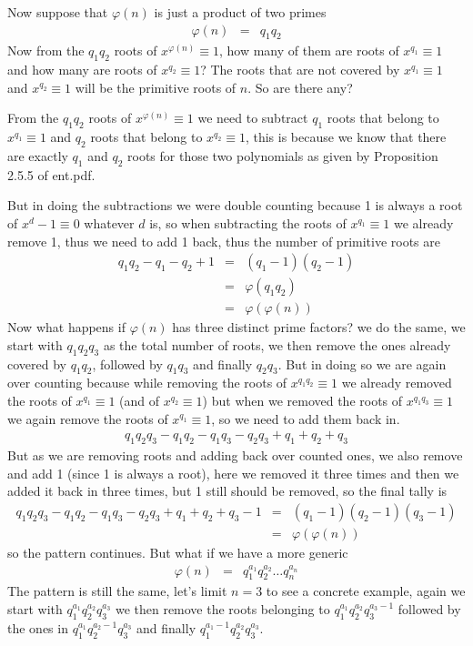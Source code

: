 \documentclass[aps,preprint,preprintnumbers,nofootinbib,showpacs,prd]{revtex4-1}
\newcommand{\nbea}{\begin{eqnarray*}}
\newcommand{\neea}{\end{eqnarray*}}
\begin{document}
Now suppose that $\varphi(n)$ is just a product of two primes
%
\nbea
\varphi(n) & = & q_1q_2
\neea
%
Now from the $q_1q_2$ roots of $x^{\varphi(n)} \equiv 1$, how many of them are roots of $x^{q_1} \equiv 1$ and how many are roots of $x^{q_2} \equiv 1$? The roots that are not covered by $x^{q_{1}} \equiv 1$ and $x^{q_{2}} \equiv 1$ will be the primitive roots of $n$. So are there any?

From the $q_1q_2$ roots of $x^{\varphi(n)} \equiv 1$ we need to subtract $q_1$ roots that belong to $x^{q_1} \equiv 1$ and $q_2$ roots that belong to $x^{q_2} \equiv 1$, this is because we know that there are exactly $q_1$ and $q_2$ roots for those two polynomials as given by Proposition 2.5.5 of ent.pdf.

But in doing the subtractions we were double counting because 1 is always a root of $x^d - 1 \equiv 0$ whatever $d$ is, so when subtracting the roots of $x^{q_1} \equiv 1$ we already remove 1, thus we need to add 1 back, thus the number of primitive roots are
%
\nbea
q_1q_2 - q_1 - q_2 + 1 & = & (q_1 - 1)(q_2 - 1) \\
& = & \varphi(q_1q_2) \\
& = & \varphi(\varphi(n))
\neea
%
Now what happens if $\varphi(n)$ has three distinct prime factors? we do the same, we start with $q_1q_2q_3$ as the total number of roots, we then remove the ones already covered by $q_1q_2$, followed by $q_1q_3$ and finally $q_2q_3$. But in doing so we are again over counting because while removing the roots of $x^{q_1q_2} \equiv 1$ we already removed the roots of $x^{q_1} \equiv 1$ (and of $x^{q_2} \equiv 1$) but when we removed the roots of $x^{q_1q_3} \equiv 1$ we again remove the roots of $x^{q_1} \equiv 1$, so we need to add them back in.
%
\nbea
q_1q_2q_3 - q_1q_2 - q_1q_3 - q_2q_3 + q_1 + q_2 + q_3
\neea
%
But as we are removing roots and adding back over counted ones, we also remove and add 1 (since 1 is always a root), here we removed it three times and then we added it back in three times, but 1 still should be removed, so the final tally is
%
\nbea
q_1q_2q_3 - q_1q_2 - q_1q_3 - q_2q_3 + q_1 + q_2 + q_3 - 1 & = & (q_1 - 1)(q_2 - 1)(q_3 - 1) \\
& = & \varphi(\varphi(n))
\neea
%
so the pattern continues. But what if we have a more generic
%
\nbea
\varphi(n) & = & q_1^{a_1}q_2^{a_2} \dots q_n^{a_n}
\neea
%
The pattern is still the same, let's limit $n=3$ to see a concrete example, again we start with $q_1^{a_1}q_2^{a_2}q_3^{a_3}$ we then remove the roots belonging to $q_1^{a_1}q_2^{a_2}q_3^{a_3-1}$ followed by the ones in $q_1^{a_1}q_2^{a_2-1}q_3^{a_3}$ and finally $q_1^{a_1-1}q_2^{a_2}q_3^{a_3}$.
\end{document}
